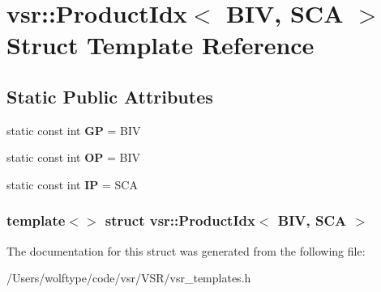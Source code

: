 \hypertarget{structvsr_1_1_product_idx_3_01_b_i_v_00_01_s_c_a_01_4}{\section{vsr\-:\-:Product\-Idx$<$ B\-I\-V, S\-C\-A $>$ Struct Template Reference}
\label{structvsr_1_1_product_idx_3_01_b_i_v_00_01_s_c_a_01_4}
}
\subsection*{Static Public Attributes}
\begin{DoxyCompactItemize}
\item 
\hypertarget{structvsr_1_1_product_idx_3_01_b_i_v_00_01_s_c_a_01_4_aae73f9b11f5fe1c553f2deb004f86452}{static const int {\bfseries G\-P} = B\-I\-V}\label{structvsr_1_1_product_idx_3_01_b_i_v_00_01_s_c_a_01_4_aae73f9b11f5fe1c553f2deb004f86452}

\item 
\hypertarget{structvsr_1_1_product_idx_3_01_b_i_v_00_01_s_c_a_01_4_a5bd23de597d1eae3502996e33f682353}{static const int {\bfseries O\-P} = B\-I\-V}\label{structvsr_1_1_product_idx_3_01_b_i_v_00_01_s_c_a_01_4_a5bd23de597d1eae3502996e33f682353}

\item 
\hypertarget{structvsr_1_1_product_idx_3_01_b_i_v_00_01_s_c_a_01_4_a3b2c5a3f5ec319f8475ab3c1e46f8c87}{static const int {\bfseries I\-P} = S\-C\-A}\label{structvsr_1_1_product_idx_3_01_b_i_v_00_01_s_c_a_01_4_a3b2c5a3f5ec319f8475ab3c1e46f8c87}

\end{DoxyCompactItemize}
\subsubsection*{template$<$$>$ struct vsr\-::\-Product\-Idx$<$ B\-I\-V, S\-C\-A $>$}



The documentation for this struct was generated from the following file\-:\begin{DoxyCompactItemize}
\item 
/\-Users/wolftype/code/vsr/\-V\-S\-R/vsr\-\_\-templates.\-h\end{DoxyCompactItemize}
